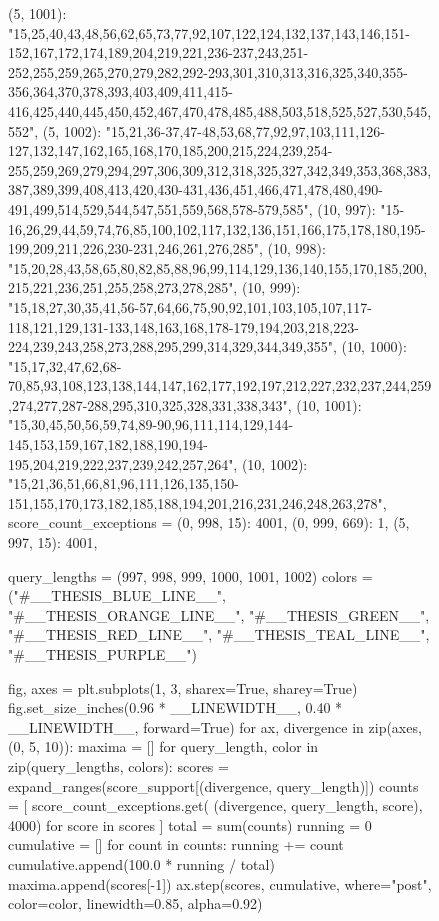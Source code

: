 \begin{figure}[H]
\begin{CacheMeCode}
{    (5, 1001): "15,25,40,43,48,56,62,65,73,77,92,107,122,124,132,137,143,146,151-152,167,172,174,189,204,219,221,236-237,243,251-252,255,259,265,270,279,282,292-293,301,310,313,316,325,340,355-356,364,370,378,393,403,409,411,415-416,425,440,445,450,452,467,470,478,485,488,503,518,525,527,530,545,552",
    (5, 1002): "15,21,36-37,47-48,53,68,77,92,97,103,111,126-127,132,147,162,165,168,170,185,200,215,224,239,254-255,259,269,279,294,297,306,309,312,318,325,327,342,349,353,368,383,387,389,399,408,413,420,430-431,436,451,466,471,478,480,490-491,499,514,529,544,547,551,559,568,578-579,585",
    (10, 997): "15-16,26,29,44,59,74,76,85,100,102,117,132,136,151,166,175,178,180,195-199,209,211,226,230-231,246,261,276,285",
    (10, 998): "15,20,28,43,58,65,80,82,85,88,96,99,114,129,136,140,155,170,185,200,215,221,236,251,255,258,273,278,285",
    (10, 999): "15,18,27,30,35,41,56-57,64,66,75,90,92,101,103,105,107,117-118,121,129,131-133,148,163,168,178-179,194,203,218,223-224,239,243,258,273,288,295,299,314,329,344,349,355",
    (10, 1000): "15,17,32,47,62,68-70,85,93,108,123,138,144,147,162,177,192,197,212,227,232,237,244,259,274,277,287-288,295,310,325,328,331,338,343",
    (10, 1001): "15,30,45,50,56,59,74,89-90,96,111,114,129,144-145,153,159,167,182,188,190,194-195,204,219,222,237,239,242,257,264",
    (10, 1002): "15,21,36,51,66,81,96,111,126,135,150-151,155,170,173,182,185,188,194,201,216,231,246,248,263,278",
}
score_count_exceptions = {
    (0, 998, 15): 4001,
    (0, 999, 669): 1,
    (5, 997, 15): 4001,
}

query_lengths = (997, 998, 999, 1000, 1001, 1002)
colors = ("#__THESIS_BLUE_LINE__", "#__THESIS_ORANGE_LINE__", "#__THESIS_GREEN__",
          "#__THESIS_RED_LINE__", "#__THESIS_TEAL_LINE__", "#__THESIS_PURPLE__")

fig, axes = plt.subplots(1, 3, sharex=True, sharey=True)
fig.set_size_inches(0.96 * __LINEWIDTH__, 0.40 * __LINEWIDTH__, forward=True)
for ax, divergence in zip(axes, (0, 5, 10)):
    maxima = []
    for query_length, color in zip(query_lengths, colors):
        scores = expand_ranges(score_support[(divergence, query_length)])
        counts = [
            score_count_exceptions.get(
                (divergence, query_length, score), 4000)
            for score in scores
        ]
        total = sum(counts)
        running = 0
        cumulative = []
        for count in counts:
            running += count
            cumulative.append(100.0 * running / total)
        maxima.append(scores[-1])
        ax.step(scores, cumulative, where="post", color=color,
                linewidth=0.85, alpha=0.92)


\end{CacheMeCode}
\end{figure}
